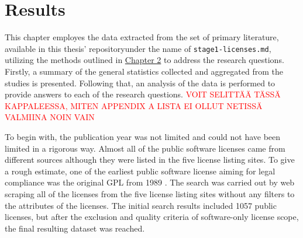 \chapter{Results\label{results}}
This chapter employes the data extracted from the set of primary literature, available in this thesis' repository\footnotemark[1] under the name of \texttt{stage1-licenses.md}, utilizing the methods outlined in \hyperref[methods]{Chapter 2} to address the research questions. Firstly, a summary of the general statistics collected and aggregated from the studies is presented. Following that, an analysis of the data is performed to provide answers to each of the research questions. \textcolor{red}{VOIT SELITTÄÄ TÄSSÄ KAPPALEESSA, MITEN APPENDIX A LISTA EI OLLUT NETISSÄ VALMIINA NOIN VAIN }

To begin with, the publication year was not limited and could not have been limited in a rigorous way. Almost all of the public software licenses came from different sources although they were listed in the five license listing sites. To give a rough estimate, one of the earliest public software license aiming for legal compliance was the original GPL from 1989 \citep{license-history}. The search was carried out by web scraping all of the licenses from the five license listing sites without any filters to the attributes of the licenses. The initial search results included 1057 public licenses, but after the exclusion and quality criteria of software-only license scope, the final resulting dataset was reached.

